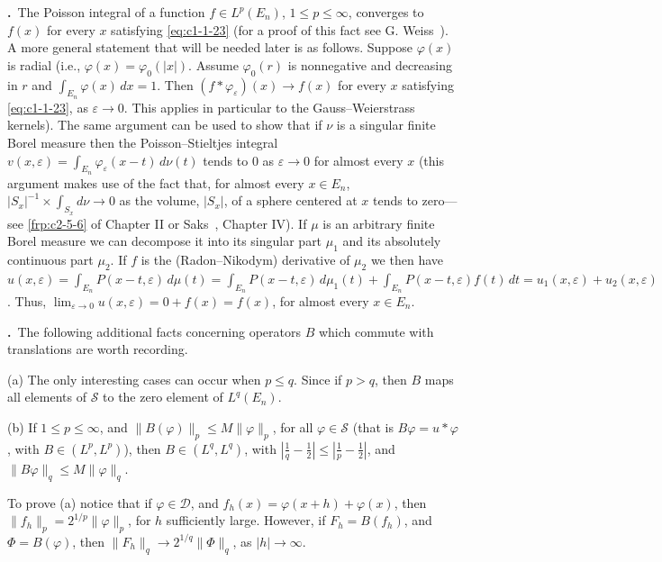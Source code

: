 \label{eq:c1-4-10}\textbf{\theequation.}~The Poisson
integral of a function $f \in L^{p}(E_{n})$, $1 \leq p \leq \infty$, converges
to $f(x)$ for every $x$ satisfying \eqref{eq:c1-1-23} (for a proof of this
fact see G. Weiss~\cite{Weiss2}). A more general statement that will be needed
later is as follows. Suppose $\varphi(x)$ is radial (i.e.,
$\varphi(x) = \varphi_{0}(|x|)$. Assume $\varphi_{0}(r)$ is nonnegative and
decreasing in $r$ and $\int_{E_{n}} \varphi(x) \, dx = 1$. Then
$(f * \varphi_{\varepsilon})(x) \to f(x)$ for every $x$ satisfying
\eqref{eq:c1-1-23}, as $\varepsilon \to 0$. This applies in particular to the
Gauss--Weierstrass kernels). The same argument can be used to show that if
$\nu$ is a singular finite Borel measure then the Poisson--Stieltjes integral
$v(x, \varepsilon) = \int_{E_{n}} \varphi_{\varepsilon}(x - t) \, d\nu(t)$
tends to $0$ as $\varepsilon \to 0$ for almost every $x$ (this argument makes
use of the fact that, for almost every $x \in E_{n}$,
$|S_{x}|^{-1} \times \int_{S_{x}} d\nu \to 0$ as the volume, $|S_{x}|$, of a
sphere centered at $x$ tends to zero---see \eqref{frp:c2-5-6} of Chapter II or
Saks~\cite{Saks1}, Chapter IV). If $\mu$ is an arbitrary finite Borel measure
we can decompose it into its singular part $\mu_{1}$ and its absolutely
continuous part $\mu_{2}$. If $f$ is the (Radon--Nikodym) derivative of
$\mu_{2}$ we then have
$u(x, \varepsilon) = \int_{E_{n}} P(x - t, \varepsilon) \, d\mu(t) = \int_{E_{n}} P(x - t, \varepsilon) \, d\mu_{1}(t) + \int_{E_{n}} P(x - t, \varepsilon)f(t) \, dt = u_{1}(x, \varepsilon) + u_{2}(x, \varepsilon)$.
Thus, $\lim_{\varepsilon\to0} u(x, \varepsilon) = 0 + f(x) = f(x)$, for almost
every $x \in E_{n}$.

\label{eq:c1-4-11}\textbf{\theequation.}~The
following additional facts concerning operators $B$ which commute with
translations are worth recording.

\textup{(a)} The only interesting cases can occur when $p \leq q$. Since if
$p > q$, then $B$ maps all elements of $\mathscr{S}$ to the zero element of
$L^{q}(E_{n})$.

\textup{(b)} If $1 \leq p \leq \infty$, and $\|B(\varphi)\|_{p} \leq M \|\varphi\|_{p}$,
for all $\varphi \in \mathscr{S}$ (that is $B\varphi = u * \varphi$, with
$B \in (L^{p}, L^{p})$), then $B \in (L^{q}, L^{q})$, with
$\left|\frac{1}{q} - \frac{1}{2}\right| \leq \left|\frac{1}{p} - \frac{1}{2}\right|$,
and $\|B\varphi\|_{q} \leq M \|\varphi\|_{q}$.

To prove (a) notice that if $\varphi \in \mathscr{D}$, and
$f_{h}(x) = \varphi(x + h) + \varphi(x)$, then
$\|f_{h}\|_{p} = 2^{1/p}\|\varphi\|_{p}$, for $h$ sufficiently large. However,
if $F_{h} = B(f_{h})$, and $\Phi = B(\varphi)$, then
$\|F_{h}\|_{q} \to 2^{1/q}\|\Phi\|_{q}$, as $|h| \to \infty$.


